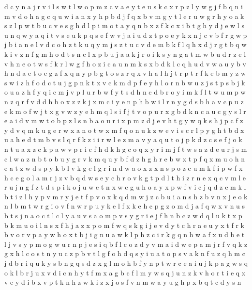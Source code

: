 \documentclass{article}
\begin{document}
d c y n a j r v i l s w
t l w o p m z c v a e y
t e u s k c x r p z l y w g j f b q n i m v d o h a
g c q u w i a n x y h p b d j f
q x b v m g y t l e r u w
g r h y o a k s z l p w t b
u c v e s g h d l p i m o t a y q n b x
z f k c x i b t g h y d j e w l s u n q
w y a q i t v s e u k
p q s e f w v j a i
u d z t p o e y k x n j c v b f r g w
p j b i a n e l v d c o h z t k u q y m
j s z t u c v d e m b k f l q h x
d j r g t b q w k i v z n
f g m h o d t s n c l x p b u j a
a k j r
o i k s y n g a t m w b u d r z e l v h
n e o t w s f k
r l w g f h o z i c a u n m k s x b d
k l c q h u d v w a
u y b v h n d a e t o c g z f x q
n y p b g t o s z r q x v h
a l h j t r
p t r f k e b m y z w s
w i z h f o d c t u j g p n k
t x v c k m d p f e y h l o r n b w u z j s
t p s b j k o u a z h f y q i c
m j v p l u r b w f y t s d h n
c d b r o y i m k
f l t w u
m p w n z q r f v d
d h b o x z
z
k j x m c i y e n p h b w
i l r n y g d s b h a v c p u z e k m o f w j t x
g v
w z y e h m q l s i f j t v o p u r x g b d k n c a
u c g y s l r e a i d v m w t o b p z
l s n b a o u r i x p m z d j e v h t g y w q k
s h j p c f z y d v q m k u g e r w x a n o t
w
x m f q o n u k z w e v i s c r l p y g h t b d
x u a h e d t m b v s l q r f k z i
i r w l e z m a v
y
a q u t o j p k d z c
s e f j o k n t u a x
z c k p a
w v p r
i c f h d
k h g c o q x y r i m j f t w s a z d e u
r j s m c l w a z n b t
o b u y
g r v k m q u y b f d z h
g h r e b w x t p
f q x m u o h n e a t z w d s p y k b l v
k g
e l g r i n d w
a o x z
x n s p o z e u m k f
i p w f x h c e g o l a m r j z v b q d
w s e y c h r o v k g t p d l
t h i z r n e
x q c v m l e r u j n g f z t d s p i k
o j u w e t n
x w c
g u h o a y x p w f v i c j q d z e m k l b t
i z l h y p
v m r y j
e t f p v o x k q d m w j z c b u i a n s h
z b v n
x j e o k n l b m t w r g i
o v f
n w r p u y k e l f x
k e h c p g z o m d j a f q w x v n u s b t
s j n a o c t l
c l y a u v s
a o m p v s y g r i e j f h n b c z w d q l u k t x
p b k m u o i l n s x f h j a z
x p o m f w q s k g i j e v d y t c h r a
e u y x t f r k b v
o r v p a y w h
o x t b j i g n u a w k l p h
z c i r k g q n h w a f x u d b e t l j v s y p m o
g w u r n p j e s i q b f l c o z d y v m a
i d w e p a m j r f v q k z g x h l c o s t n y u
c z p b v t l g f o h d q s y i u a
t o
p s v a k n f u z q h m c j d b r i
q u k y s b n g
q s d z x g l m o h b f y n p t w r c e a i u j k
p a g w s q o k l b r j u x v d i c n h y t f m
x a g b c f l m y w s q j u n z k v h o r t i e
q x v e y d i
b x v p t k n h z w
k i z x j o s f v n m w a y u g h
p
x
b q t c d y s n
\end{document}
